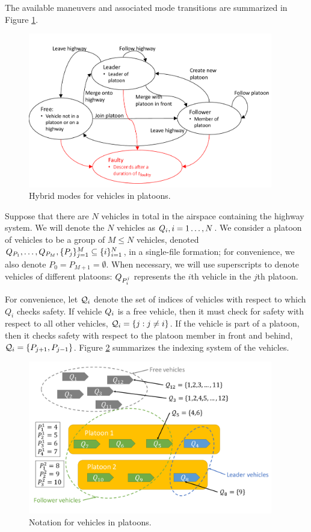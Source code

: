 The available maneuvers and associated mode transitions are summarized in Figure \ref{fig:vehicleModes}.

\begin{figure}
	\centering
	\includegraphics[width=0.95\textwidth]{"fig/vehicleModes"}
	\caption{Hybrid modes for vehicles in platoons.}
	\label{fig:vehicleModes}
\end{figure}

Suppose that there are $N$ vehicles in total in the airspace containing the highway system. We will denote the $N$ vehicles as $Q_{i}, i=1\ldots,N$. We consider a platoon of vehicles to be a group of $M\le N$ vehicles, denoted $Q_{P_1}, \ldots, Q_{P_M}, \{P_j\}_{j=1}^M \subseteq \{i\}_{i=1}^N$, in a single-file formation; for convenience, we also denote $P_0 = P_{M+1} = \emptyset$. When necessary, we will use superscripts to denote vehicles of different platoons: $Q_{P_i^j}$ represents the $i$th vehicle in the $j$th platoon. 

For convenience, let $\mathcal{Q}_{i}$ denote the set of indices of vehicles with respect to which $Q_i$ checks safety. If vehicle $Q_{i}$ is a free vehicle, then it must check for safety with respect to all other vehicles, $\mathcal{Q}_{i} = \{j: j\neq i\}$. If the vehicle is part of a platoon, then it checks safety with respect to the platoon member in front and behind, $\mathcal{Q}_{i} = \{P_{j+1}, P_{j-1}\}$. Figure \ref{fig:vehicleNotation} summarizes the indexing system of the vehicles.

\begin{figure}
	\centering
	\includegraphics[width=0.95\textwidth]{"fig/vehicleNotation"}
	\caption{Notation for vehicles in platoons.}
	\label{fig:vehicleNotation}
\end{figure}

